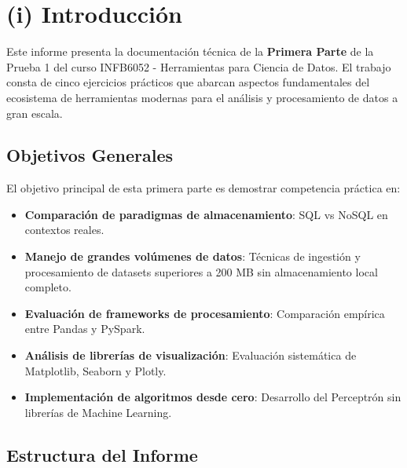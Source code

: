 \documentclass[12pt]{src/formato_utem}
\begin{document}
\pagestyle{fancy}
\makemytitle

\newpage



\section*{(i) Introducción}

Este informe presenta la documentación técnica de la \textbf{Primera Parte} de la Prueba 1 del curso INFB6052 - Herramientas para Ciencia de Datos. El trabajo consta de cinco ejercicios prácticos que abarcan aspectos fundamentales del ecosistema de herramientas modernas para el análisis y procesamiento de datos a gran escala.

\subsection*{Objetivos Generales}

El objetivo principal de esta primera parte es demostrar competencia práctica en:

\begin{itemize}
    \item \textbf{Comparación de paradigmas de almacenamiento}: SQL vs NoSQL en contextos reales.
    \item \textbf{Manejo de grandes volúmenes de datos}: Técnicas de ingestión y procesamiento de datasets superiores a 200 MB sin almacenamiento local completo.
    \item \textbf{Evaluación de frameworks de procesamiento}: Comparación empírica entre Pandas y PySpark.
    \item \textbf{Análisis de librerías de visualización}: Evaluación sistemática de Matplotlib, Seaborn y Plotly.
    \item \textbf{Implementación de algoritmos desde cero}: Desarrollo del Perceptrón sin librerías de Machine Learning.
\end{itemize}

\subsection*{Estructura del Informe}
\end{document}
